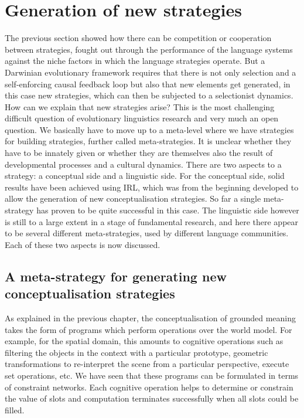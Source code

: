 \section{Generation of new strategies}

The previous section showed how there can be competition or cooperation between strategies, fought out through the 
performance of the language systems against the niche factors in which 
the language strategies operate. But a Darwinian evolutionary framework requires that there is not only 
selection and a self-enforcing causal feedback loop 
but also that new elements get generated, in this case new strategies, which can then be subjected to 
a selectionist dynamics. How can we explain that new 
strategies arise? This is the most challenging difficult question of evolutionary linguistics research and very much an 
open question. We basically have to move up to a meta-level where we have strategies for building 
strategies, further called meta-strategies.  It is unclear whether they have to be innately given or 
whether they are themselves also the result of developmental processes and a cultural dynamics. 
There are two aspects to a strategy: a conceptual side and a linguistic side. For the conceptual 
side, solid results have been achieved using IRL, which was from the beginning developed to allow the generation of 
new conceptualisation strategies. So far a single meta-strategy has proven to be quite successful in this case. 
The linguistic side however is still to a large extent in a stage of fundamental research, and here there appear to 
be several different meta-strategies, used by different language communities. Each of these two aspects is now 
discussed.

\subsection{A meta-strategy for generating new conceptualisation strategies}

As explained in the previous chapter, the conceptualisation of grounded meaning takes the form of programs which perform 
operations over the world model. For example, for the spatial domain, this amounts to
cognitive operations such as filtering the objects in the context with a particular prototype, geometric 
transformations to re-interpret the scene from a particular perspective, execute set operations, etc. We have seen that these 
programs can be formulated in terms of constraint networks. Each cognitive operation helps to determine or constrain
the value of slots and computation terminates successfully when all slots could be filled. 


